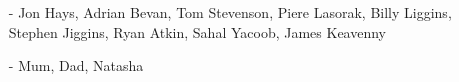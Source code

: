 \clearpage


\begin{acknowledgements}
\begin{itemize}
\item[-] Jon Hays, Adrian Bevan, Tom Stevenson, Piere Lasorak, Billy Liggins, Stephen Jiggins, Ryan Atkin, Sahal Yacoob, James Keavenny
\item[-] Mum, Dad, Natasha
\end{itemize}
\end{acknowledgements}
\clearpage